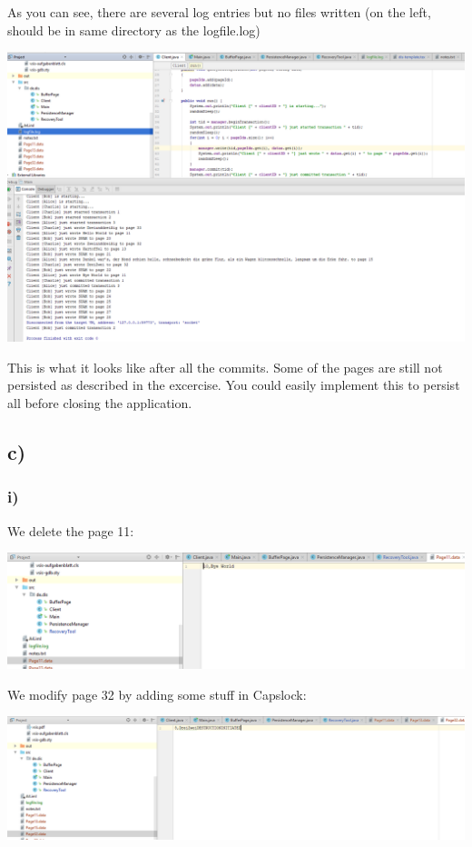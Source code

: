 \documentclass[ngerman]{dis-template-add}
\begin{document}
As you can see, there are several log entries but no files written (on the left, should be in same directory as the logfile.log)

\includegraphics[scale=0.4]{exb2.png}

This is what it looks like after all the commits. Some of the pages are still not persisted as described in the excercise.
You could easily implement this to persist all before closing the application.

\subsection*{c)}
\subsubsection*{i)}
We delete the page 11:

\includegraphics[scale=0.5]{excp11.png}

We modify page 32 by adding some stuff in Capslock:

\includegraphics[scale=0.5]{excp32.png}
\end{document}
